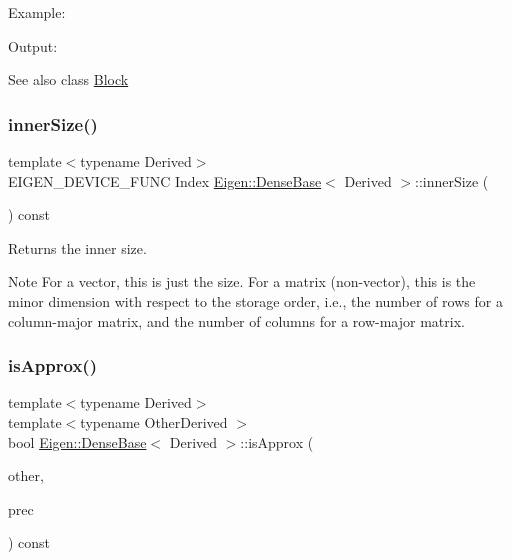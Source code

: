Example\+: 
\begin{DoxyCodeInclude}{0}
\end{DoxyCodeInclude}
 Output\+: 
\begin{DoxyVerbInclude}
\end{DoxyVerbInclude}


\begin{DoxySeeAlso}{See also}
class \mbox{\hyperlink{class_eigen_1_1_block}{Block}} 
\end{DoxySeeAlso}
\mbox{\label{class_eigen_1_1_dense_base_a57c6f5516aa86d4c22f382f1a069a319}} 
\subsubsection{\texorpdfstring{innerSize()}{innerSize()}}
{\footnotesize\ttfamily template$<$typename Derived$>$ \\
E\+I\+G\+E\+N\+\_\+\+D\+E\+V\+I\+C\+E\+\_\+\+F\+U\+NC Index \mbox{\hyperlink{class_eigen_1_1_dense_base}{Eigen\+::\+Dense\+Base}}$<$ Derived $>$\+::inner\+Size (\begin{DoxyParamCaption}{ }\end{DoxyParamCaption}) const\hspace{0.3cm}{\ttfamily [inline]}}

\begin{DoxyReturn}{Returns}
the inner size.
\end{DoxyReturn}
\begin{DoxyNote}{Note}
For a vector, this is just the size. For a matrix (non-\/vector), this is the minor dimension with respect to the storage order, i.\+e., the number of rows for a column-\/major matrix, and the number of columns for a row-\/major matrix. 
\end{DoxyNote}
\mbox{\label{class_eigen_1_1_dense_base_a8848223bc635c9c10e7cc68ae343ad81}} 
\subsubsection{\texorpdfstring{isApprox()}{isApprox()}}
{\footnotesize\ttfamily template$<$typename Derived$>$ \\
template$<$typename Other\+Derived $>$ \\
bool \mbox{\hyperlink{class_eigen_1_1_dense_base}{Eigen\+::\+Dense\+Base}}$<$ Derived $>$\+::is\+Approx (\begin{DoxyParamCaption}\item[{const \mbox{\hyperlink{class_eigen_1_1_dense_base}{Dense\+Base}}$<$ Other\+Derived $>$ \&}]{other,  }\item[{const Real\+Scalar \&}]{prec }\end{DoxyParamCaption}) const}

